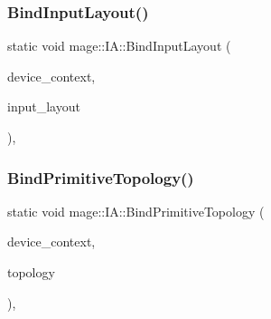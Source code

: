 \hypertarget{structmage_1_1_i_a_a78152baab8a1f0cd08c27ca5bda7c11e}{}\label{structmage_1_1_i_a_a78152baab8a1f0cd08c27ca5bda7c11e} 
\subsubsection{\texorpdfstring{Bind\+Input\+Layout()}{BindInputLayout()}}
{\footnotesize\ttfamily static void mage\+::\+I\+A\+::\+Bind\+Input\+Layout (\begin{DoxyParamCaption}\item[{I\+D3\+D11\+Device\+Context2 $\ast$}]{device\+\_\+context,  }\item[{I\+D3\+D11\+Input\+Layout $\ast$}]{input\+\_\+layout }\end{DoxyParamCaption})\hspace{0.3cm}{\ttfamily [static]}, {\ttfamily [noexcept]}}

\hypertarget{structmage_1_1_i_a_a72c6a09ee515a2618716aa9bba6e0490}{}\label{structmage_1_1_i_a_a72c6a09ee515a2618716aa9bba6e0490} 
\subsubsection{\texorpdfstring{Bind\+Primitive\+Topology()}{BindPrimitiveTopology()}}
{\footnotesize\ttfamily static void mage\+::\+I\+A\+::\+Bind\+Primitive\+Topology (\begin{DoxyParamCaption}\item[{I\+D3\+D11\+Device\+Context2 $\ast$}]{device\+\_\+context,  }\item[{D3\+D11\+\_\+\+P\+R\+I\+M\+I\+T\+I\+V\+E\+\_\+\+T\+O\+P\+O\+L\+O\+GY}]{topology }\end{DoxyParamCaption})\hspace{0.3cm}{\ttfamily [static]}, {\ttfamily [noexcept]}}

\hypertarget{structmage_1_1_i_a_adb567da46ff80b37b73b07109967db72}{}\label{structmage_1_1_i_a_adb567da46ff80b37b73b07109967db72} 

